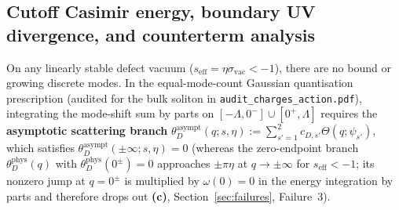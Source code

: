 \documentclass[11pt,a4paper]{article}
\newcommand{\Lc}{\textsf{\textbf{(c)}}}
\theoremstyle{remark}
\begin{document}
\subsection{Cutoff Casimir energy, boundary UV divergence, and counterterm analysis}

On any linearly stable defect vacuum ($s_{\mathrm{eff}} = \eta\sigma_{\mathrm{vac}} < -1$),
there are no bound or growing discrete modes. In the equal-mode-count Gaussian
quantisation prescription \cite[App.~6]{FK} (audited for the bulk soliton in
\texttt{audit\_charges\_action.pdf}), integrating the mode-shift sum by parts on
$[-\Lambda,0^-] \cup [0^+,\Lambda]$ requires the \textbf{asymptotic scattering
branch} $\theta_D^{\mathrm{asympt}}(q;s,\eta) := \sum_{s'=1}^2 c_{D,s'}\Theta(q;\psi_{s'})$,
which satisfies $\theta_D^{\mathrm{asympt}}(\pm\infty;s,\eta) = 0$ (whereas the
zero-endpoint branch $\theta_D^{\mathrm{phys}}(q)$ with $\theta_D^{\mathrm{phys}}(0^\pm)=0$
approaches $\pm\pi\eta$ at $q\to\pm\infty$ for $s_{\mathrm{eff}}<-1$; its nonzero
jump at $q=0^\pm$ is multiplied by $\omega(0)=0$ in the energy integration by
parts and therefore drops out \Lc, Section~\ref{sec:failures}, Failure~3).
\end{document}
